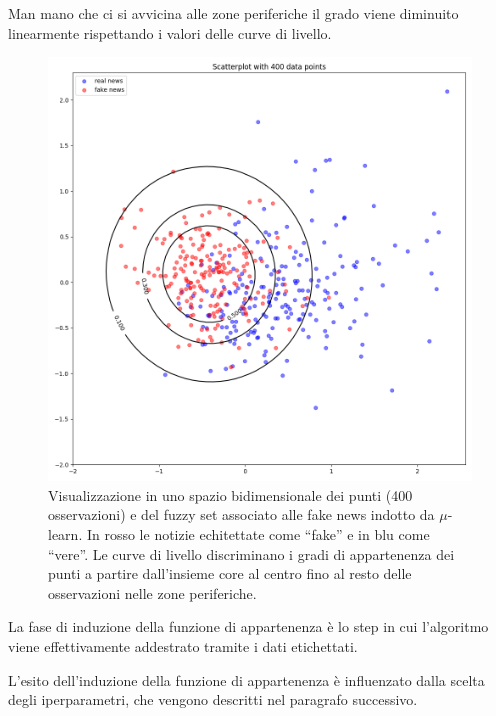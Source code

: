 \documentclass[12pt]{report}
\theoremstyle{definition}
\begin{document}
Man mano che ci si avvicina alle zone periferiche il grado viene diminuito linearmente rispettando i valori delle curve di livello.
\begin{figure}
    \centering
    \includegraphics[scale=0.44]{images/mulearn.png}
    \caption{Visualizzazione in uno spazio bidimensionale dei punti (400 osservazioni) e del fuzzy set associato alle fake news indotto da $\mu$-learn. In rosso le notizie echitettate come ``fake'' e in blu come ``vere''.
    Le curve di livello discriminano i gradi di appartenenza dei punti a partire dall'insieme core al centro fino al resto delle osservazioni nelle zone periferiche.}
    \label{mulearnplot}
\end{figure}
La fase di induzione della funzione di appartenenza è lo step in cui l'algoritmo viene effettivamente addestrato tramite i dati etichettati.

L'esito dell'induzione della funzione di appartenenza è influenzato dalla scelta degli iperparametri, che vengono descritti nel paragrafo successivo.
\end{document}
